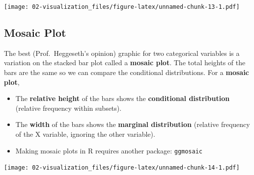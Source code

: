 \documentclass[
]{book}
\newenvironment{Shaded}{\begin{snugshade}}{\end{snugshade}}
\newcommand{\DataTypeTok}[1]{\textcolor[rgb]{0.13,0.29,0.53}{#1}}
\newcommand{\KeywordTok}[1]{\textcolor[rgb]{0.13,0.29,0.53}{\textbf{#1}}}
\newcommand{\NormalTok}[1]{#1}
\newcommand{\OperatorTok}[1]{\textcolor[rgb]{0.81,0.36,0.00}{\textbf{#1}}}
\newcommand{\StringTok}[1]{\textcolor[rgb]{0.31,0.60,0.02}{#1}}
\providecommand{\tightlist}{%
  \setlength{\itemsep}{0pt}\setlength{\parskip}{0pt}}
\begin{document}
\texttt{[image: 02-visualization\_files/figure-latex/unnamed-chunk-13-1.pdf]}

\hypertarget{mosaic-plot}{%
\subsection{Mosaic Plot}\label{mosaic-plot}}

The best (Prof.~Heggeseth's opinion) graphic for two categorical variables is a variation on the stacked bar plot called a \textbf{mosaic plot}. The total heights of the bars are the same so we can compare the conditional distributions. For a \textbf{mosaic plot},

\begin{itemize}
\tightlist
\item
  The \textbf{relative height} of the bars shows the \textbf{conditional distribution} (relative frequency within subsets).
\item
  The \textbf{width} of the bars shows the \textbf{marginal distribution} (relative frequency of the X variable, ignoring the other variable).
\item
  Making mosaic plots in R requires another package: \texttt{ggmosaic}
\end{itemize}

\begin{Shaded}
\end{Shaded}

\texttt{[image: 02-visualization\_files/figure-latex/unnamed-chunk-14-1.pdf]}
\end{document}
